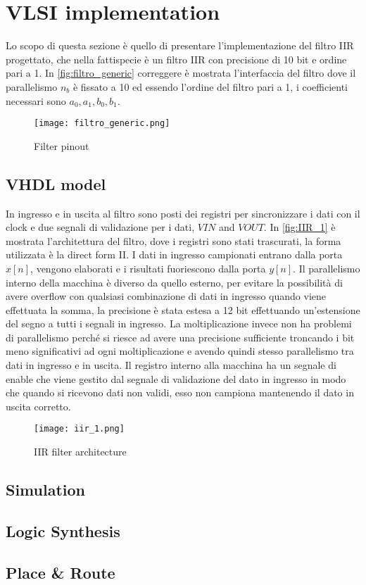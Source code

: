 \section{VLSI implementation}

Lo scopo di questa sezione è quello di presentare l'implementazione del filtro IIR progettato, che nella fattispecie è un filtro IIR con precisione di 10 bit e ordine pari a 1. In \autoref{fig:filtro_generic} {\LARGE correggere} è mostrata l'interfaccia del filtro dove il parallelismo $n_b$ è fissato a 10 ed essendo l'ordine del filtro pari a 1, i coefficienti necessari sono $a_0, a_1, b_0, b_1$. 

\begin{figure}[h]
	\center
	\texttt{[image: filtro\_generic.png]}
	\caption{Filter pinout}
	\label{fig:filtro_generic}
\end{figure}


\subsection{VHDL model}
In ingresso e in uscita al filtro sono posti dei registri per sincronizzare i dati con il clock e due segnali di validazione per i dati, $VIN$ and $VOUT$. In \autoref{fig:IIR_1} è mostrata l'architettura del filtro, dove i registri sono stati trascurati, la forma utilizzata è la direct form II. I dati in ingresso campionati entrano dalla porta $x[n]$, vengono elaborati e i risultati fuoriescono dalla porta $y[n]$. Il parallelismo interno della macchina è diverso da quello esterno, per evitare la possibilità di avere overflow con qualsiasi combinazione di dati in ingresso quando viene effettuata la somma, la precisione è stata estesa a 12 bit effettuando un'estensione del segno a tutti i segnali in ingresso. La moltiplicazione invece non ha problemi di parallelismo perché si riesce ad avere una precisione sufficiente troncando i bit meno significativi ad ogni moltiplicazione e avendo quindi stesso parallelismo tra dati in ingresso e in uscita. Il registro interno alla macchina ha un segnale di enable che viene gestito dal segnale di validazione del dato in ingresso in modo che quando si ricevono dati non validi, esso non campiona mantenendo il dato in uscita corretto.

\begin{figure}[h]
	\center
	\texttt{[image: iir\_1.png]}
	\caption{IIR filter architecture}
	\label{fig:IIR_1}
\end{figure}

\subsection{Simulation}

\subsection{Logic Synthesis}

\subsection{Place \& Route}